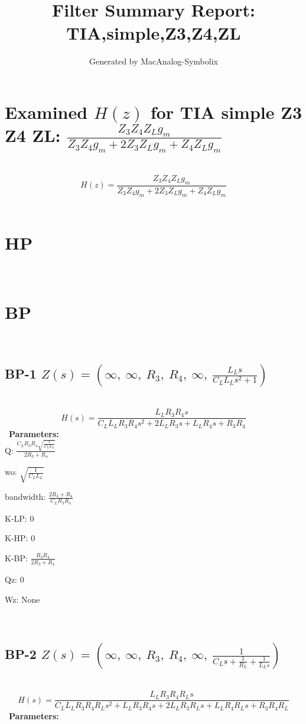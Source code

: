 \documentclass{article}
\begin{document}
        
                        \title{Filter Summary Report: TIA,simple,Z3,Z4,ZL}
                        \author{Generated by MacAnalog-Symbolix}
                        \maketitle

                        \tableofcontents
                        \newpage
                        \section{Examined $H(z)$ for TIA simple Z3 Z4 ZL: $\frac{Z_{3} Z_{4} Z_{L} g_{m}}{Z_{3} Z_{4} g_{m} + 2 Z_{3} Z_{L} g_{m} + Z_{4} Z_{L} g_{m}}$ }\ 
\textbf{\[H(z) = \frac{Z_{3} Z_{4} Z_{L} g_{m}}{Z_{3} Z_{4} g_{m} + 2 Z_{3} Z_{L} g_{m} + Z_{4} Z_{L} g_{m}}\] }\ 
\section{HP}\ 
\section{BP}\ 
\subsection{BP-1 $Z(s) = \left( \infty, \  \infty, \  R_{3}, \  R_{4}, \  \infty, \  \frac{L_{L} s}{C_{L} L_{L} s^{2} + 1}\right)$ } \ 
\textbf{\[H(s) = \frac{L_{L} R_{3} R_{4} s}{C_{L} L_{L} R_{3} R_{4} s^{2} + 2 L_{L} R_{3} s + L_{L} R_{4} s + R_{3} R_{4}}\] } \ 
\textbf{Parameters:}\\ 

Q: $\frac{C_{L} R_{3} R_{4} \sqrt{\frac{1}{C_{L} L_{L}}}}{2 R_{3} + R_{4}}$\ 

wo: $\sqrt{\frac{1}{C_{L} L_{L}}}$\ 

bandwidth: $\frac{2 R_{3} + R_{4}}{C_{L} R_{3} R_{4}}$\ 

K-LP: $0$\ 

K-HP: $0$\ 

K-BP: $\frac{R_{3} R_{4}}{2 R_{3} + R_{4}}$\ 

Qz: $0$\ 

Wz: $\text{None}$\ 

\ 

\subsection{BP-2 $Z(s) = \left( \infty, \  \infty, \  R_{3}, \  R_{4}, \  \infty, \  \frac{1}{C_{L} s + \frac{1}{R_{L}} + \frac{1}{L_{L} s}}\right)$ } \ 
\textbf{\[H(s) = \frac{L_{L} R_{3} R_{4} R_{L} s}{C_{L} L_{L} R_{3} R_{4} R_{L} s^{2} + L_{L} R_{3} R_{4} s + 2 L_{L} R_{3} R_{L} s + L_{L} R_{4} R_{L} s + R_{3} R_{4} R_{L}}\] } \ 
\textbf{Parameters:}\\ 
\end{document}
